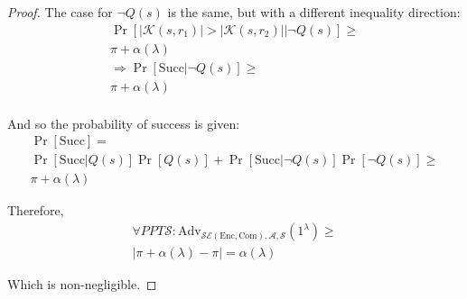 \begin{proof}
The case for $\lnot Q(s)$ is the same, but with a different inequality direction:
\begin{align*}
    \Pr[|\mathcal{K}(s, r_1)| > |\mathcal{K}(s, r_2)||\lnot Q(s)]
        \geq\\
        \pi + \alpha(\lambda)\\
    \Rightarrow \Pr[\text{Succ}|\lnot Q(s)] \geq\\
    \pi + \alpha(\lambda)\\
\end{align*}

And so the probability of success is given:
\begin{align*}
    \Pr[\text{Succ}] =\\
    \Pr[\text{Succ}|Q(s)]\Pr[Q(s)]
    +
    \Pr[\text{Succ}|\lnot Q(s)]\Pr[\lnot Q(s)] \geq\\
    \pi + \alpha(\lambda)
\end{align*}

Therefore,
\begin{align*}
    \forall PPT \mathcal{S}:
    \text{Adv}_{\mathcal{SE}(\textrm{Enc}, \textrm{Com}), \mathcal{A}, \mathcal{S}}
        (1^\lambda)
    \geq\\
    |\pi + \alpha(\lambda) - \pi| = \alpha(\lambda)
\end{align*}

Which is non-negligible.

\end{proof}

\begin{lemma}[Amplification]
\end{lemma}

